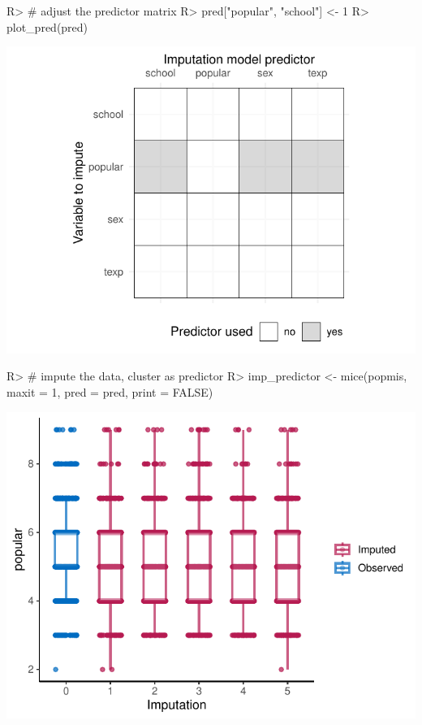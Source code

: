 \documentclass[
]{jss}
\begin{document}
\begin{CodeChunk}
\begin{CodeInput}
R> # adjust the predictor matrix
R> pred["popular", "school"] <- 1 
R> plot_pred(pred)
\end{CodeInput}


\begin{center}\includegraphics{Imputation_of_Incomplete_Multilevel_Data_files/figure-latex/pop_predictor-1} \end{center}

\begin{CodeInput}
R> # impute the data, cluster as predictor
R> imp_predictor <- mice(popmis, maxit = 1, pred = pred, print = FALSE)
\end{CodeInput}
\end{CodeChunk}

\begin{CodeChunk}


\begin{center}\includegraphics{Imputation_of_Incomplete_Multilevel_Data_files/figure-latex/pop_predictor_eval-1} \end{center}

\end{CodeChunk}
\end{document}
